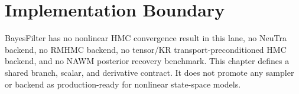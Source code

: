 \section{Implementation Boundary}
\label{sec:bf-hd-hmc-boundary}

BayesFilter has no nonlinear HMC convergence result in this lane, no NeuTra
backend, no RMHMC backend, no tensor/KR transport-preconditioned HMC backend,
and no NAWM posterior recovery benchmark.  This chapter defines a shared branch,
scalar, and derivative contract.  It does not promote any sampler or backend as
production-ready for nonlinear state-space models.
